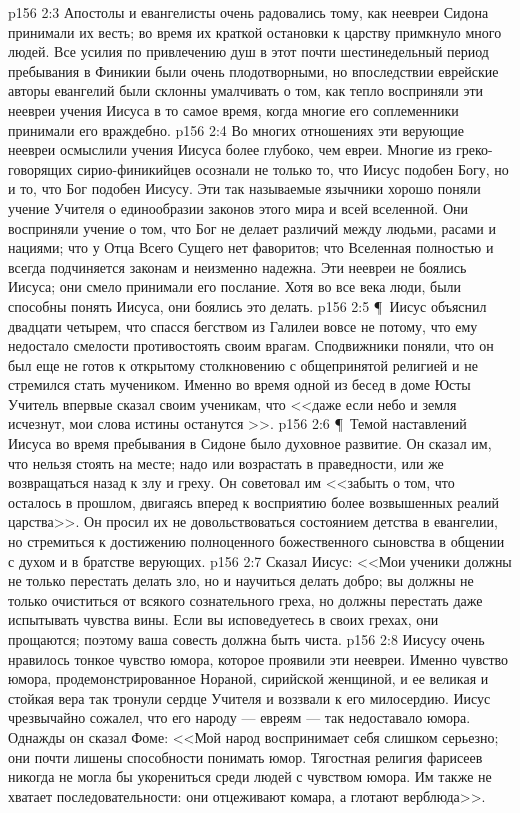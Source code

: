 \vs p156 2:3 Апостолы и евангелисты очень радовались тому, как неевреи Сидона принимали их весть; во время их краткой остановки к царству примкнуло много людей. Все усилия по привлечению душ в этот почти шестинедельный период пребывания в Финикии были очень плодотворными, но впоследствии еврейские авторы евангелий были склонны умалчивать о том, как тепло восприняли эти неевреи учения Иисуса в то самое время, когда многие его соплеменники принимали его враждебно.
\vs p156 2:4 Во многих отношениях эти верующие неевреи осмыслили учения Иисуса более глубоко, чем евреи. Многие из греко\hyp{}говорящих сирио\hyp{}финикийцев осознали не только то, что Иисус подобен Богу, но и то, что Бог подобен Иисусу. Эти так называемые язычники хорошо поняли учение Учителя о единообразии законов этого мира и всей вселенной. Они восприняли учение о том, что Бог не делает различий между людьми, расами и нациями; что у Отца Всего Сущего нет фаворитов; что Вселенная полностью и всегда подчиняется законам и неизменно надежна. Эти неевреи не боялись Иисуса; они смело принимали его послание. Хотя во все века люди, были способны понять Иисуса, они боялись это делать.
\vs p156 2:5 \P\ Иисус объяснил двадцати четырем, что спасся бегством из Галилеи вовсе не потому, что ему недостало смелости противостоять своим врагам. Сподвижники поняли, что он был еще не готов к открытому столкновению с общепринятой религией и не стремился стать мучеником. Именно во время одной из бесед в доме Юсты Учитель впервые сказал своим ученикам, что <<даже если небо и земля исчезнут, мои слова истины останутся >>.
\vs p156 2:6 \P\ Темой наставлений Иисуса во время пребывания в Сидоне было духовное развитие. Он сказал им, что нельзя стоять на месте; надо или возрастать в праведности, или же возвращаться назад к злу и греху. Он советовал им <<забыть о том, что осталось в прошлом, двигаясь вперед к восприятию более возвышенных реалий царства>>. Он просил их не довольствоваться состоянием детства в евангелии, но стремиться к достижению полноценного божественного сыновства в общении с духом и в братстве верующих.
\vs p156 2:7 Сказал Иисус: <<Мои ученики должны не только перестать делать зло, но и научиться делать добро; вы должны не только очиститься от всякого сознательного греха, но должны перестать даже испытывать чувства вины. Если вы исповедуетесь в своих грехах, они прощаются; поэтому ваша совесть должна быть чиста.
\vs p156 2:8 Иисусу очень нравилось тонкое чувство юмора, которое проявили эти неевреи. Именно чувство юмора, продемонстрированное Нораной, сирийской женщиной, и ее великая и стойкая вера так тронули сердце Учителя и воззвали к его милосердию. Иисус чрезвычайно сожалел, что его народу --- евреям --- так недоставало юмора. Однажды он сказал Фоме: <<Мой народ воспринимает себя слишком серьезно; они почти лишены способности понимать юмор. Тягостная религия фарисеев никогда не могла бы укорениться среди людей с чувством юмора. Им также не хватает последовательности: они отцеживают комара, а глотают верблюда>>.
